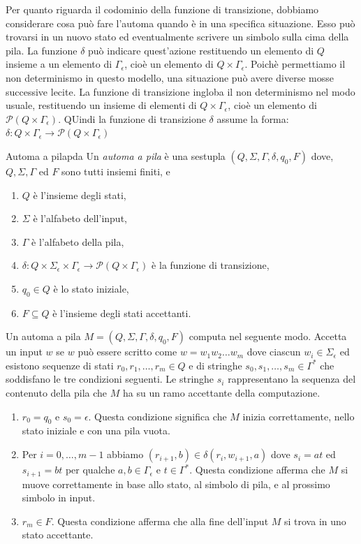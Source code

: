 \documentclass[12pt]{report}
\newcounter{definition}
\newcommand{\nmu}{}
\begin{document}
Per quanto riguarda il codominio della funzione di transizione, dobbiamo considerare cosa può fare l'automa quando è in una specifica situazione. Esso può trovarsi in un nuovo stato ed eventualmente scrivere un simbolo sulla cima della pila. La funzione $\delta$ può indicare quest'azione restituendo un elemento di $Q$ insieme a un elemento di $\Gamma_\epsilon$, cioè un elemento di $Q \times \Gamma_\epsilon$.  Poichè permettiamo il non determinismo in questo modello, una situazione può avere diverse mosse successive lecite. La funzione di transizione ingloba il non determinismo nel modo usuale, restituendo un insieme di elementi di $Q \times \Gamma_\epsilon$, cioè un elemento di $\mathcal{P}(Q \times \Gamma_\epsilon)$. QUindi la funzione di transizione $\delta$ assume la forma: $\delta: Q \times \Gamma_\epsilon \to \mathcal{P}(Q \times \Gamma_\epsilon)$
\begin{definition}{\nmu Automa a pila}{pda}
	Un \textit{automa a pila} è una sestupla $(Q, \Sigma, \Gamma, \delta, q_0, F)$ dove, $Q, \Sigma, \Gamma$ ed $F$ sono tutti insiemi finiti, e
	\begin{enumerate}
		\item $Q$ è l'insieme degli stati,
		\item $\Sigma$ è l'alfabeto dell'input,
		\item $\Gamma$ è l'alfabeto della pila,
		\item $\delta: Q \times \Sigma_\epsilon \times \Gamma_\epsilon \to \mathcal{P}(Q \times \Gamma_\epsilon)$ è la funzione di transizione,
		\item $q_0 \in Q$ è lo stato iniziale,
		\item $F \subseteq Q$ è l'insieme degli stati accettanti.
	\end{enumerate}
\end{definition}
Un automa a pila $M = (Q, \Sigma, \Gamma, \delta, q_0, F)$ computa nel seguente modo. Accetta un input $w$ se $w$ può essere scritto come $w = w_1w_2\dots w_m$ dove ciascun $w_i \in \Sigma_\epsilon$  ed esistono sequenze di stati $r_0, r_1, \dots, r_m \in Q$ e di stringhe $s_0, s_1, \dots, s_m \in \Gamma^*$ che soddisfano le tre condizioni seguenti. Le stringhe $s_i$ rappresentano la sequenza del contenuto della pila che $M$ ha su un ramo accettante della computazione.
\begin{enumerate}
	\item $r_0 = q_0$ e $s_0 = \epsilon$. Questa condizione significa che $M$ inizia correttamente, nello stato iniziale e con una pila vuota.
	\item Per $i = 0, \dots, m-1$ abbiamo $(r_{i+1}, b) \in \delta(r_i, w_{i+1}, a)$ dove $s_i = at$ ed $s_{i+1} = bt$ per qualche $a, b \in \Gamma_\epsilon$ e $t \in \Gamma^*$. Questa condizione afferma che $M$ si muove correttamente in base allo stato, al simbolo di pila, e al prossimo simbolo in input.
	\item $r_m \in F$. Questa condizione afferma che alla fine dell'input $M$ si trova in uno stato accettante.
\end{enumerate}
\end{document}
